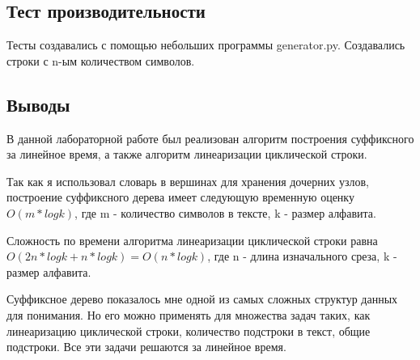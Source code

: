 \documentclass[12pt]{article}
\begin{document}
\newpage

\subsection*{Тест производительности}

Тесты создавались с помощью небольших программы generator.py. Создавались строки с n-ым количеством символов.


\subsection*{Выводы}

В данной лабораторной работе был реализован алгоритм построения суффиксного за линейное время, а также алгоритм линеаризации циклической строки.

Так как я использовал словарь в вершинах для хранения дочерних узлов, построение суффиксного дерева имеет следующую временную оценку $O(m * logk)$, где m - количество символов в тексте, k - размер алфавита.

Сложность по времени алгоритма линеаризации циклической строки равна $O(2n * logk + n * logk) = O(n * logk)$, где n - длина изначального среза, k - размер алфавита.

Суффиксное дерево показалось мне одной из самых сложных структур данных для понимания. Но его можно применять для множества задач таких, как линеаризацию циклической строки, количество подстроки в текст, общие подстроки. Все эти задачи решаются за линейное время.
\end{document}
